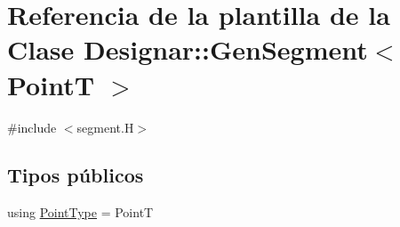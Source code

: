\hypertarget{class_designar_1_1_gen_segment}{}\section{Referencia de la plantilla de la Clase Designar\+:\+:Gen\+Segment$<$ PointT $>$}
\label{class_designar_1_1_gen_segment}


{\ttfamily \#include $<$segment.\+H$>$}

\subsection*{Tipos públicos}
\begin{DoxyCompactItemize}
\item 
using \hyperlink{class_designar_1_1_gen_segment_a411a0e6d28251be878c23ad4dbec71bb}{Point\+Type} = PointT
\end{DoxyCompactItemize}

